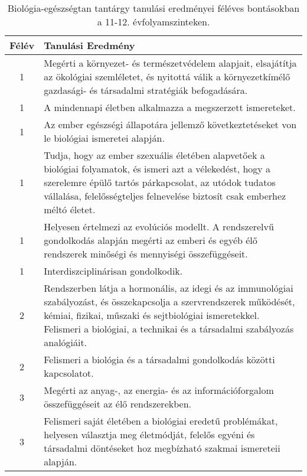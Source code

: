        
           \begin{longtable}{c | p{} }
            \caption[Biológia-egészségtan 11-12.]{Biológia-egészségtan tantárgy tanulási eredményei féléves bontásokban a 11-12. évfolyamszinteken. }  \\

            \textbf{Félév} & \textbf{Tanulási Eredmény} \\
            \hline
            \endhead
                                
                                          1 &  Megérti a környezet- és természetvédelem alapjait, elsajátítja az ökológiai szemléletet, és nyitottá válik a környezetkímélő gazdasági- és társadalmi stratégiák befogadására. \\ \hline
                                          1 &  A mindennapi életben alkalmazza a megszerzett ismereteket. \\ \hline
                                          1 &  Az ember egészségi állapotára jellemző következtetéseket von le biológiai ismeretei alapján. \\ \hline
                                          1 &  Tudja, hogy az ember szexuális életében alapvetőek a biológiai folyamatok, és ismeri azt a vélekedést, hogy a szerelemre épülő tartós párkapcsolat, az utódok tudatos vállalása, felelősségteljes felnevelése biztosít csak emberhez méltó életet. \\ \hline
                                          1 &  Helyesen értelmezi az evolúciós modellt. A rendszerelvű gondolkodás alapján megérti az emberi és egyéb élő rendszerek minőségi és mennyiségi összefüggéseit. \\ \hline
                                          1 &  Interdiszciplinárisan gondolkodik. \\ \hline
                                      
                                
                                          2 &  Rendszerben látja a hormonális, az idegi és az immunológiai szabályozást, és összekapcsolja a szervrendszerek működését, kémiai, fizikai, műszaki és sejtbiológiai ismeretekkel. Felismeri a biológiai, a technikai és a társadalmi szabályozás analógiáit. \\ \hline
                                          2 &  Felismeri a biológia és a társadalmi gondolkodás közötti kapcsolatot. \\ \hline
                                      
                                
                                          3 &  Megérti az anyag-, az energia- és az információforgalom összefüggéseit az élő rendszerekben. \\ \hline
                                          3 &  Felismeri saját életében a biológiai eredetű problémákat, helyesen választja meg életmódját, felelős egyéni és társadalmi döntéseket hoz megbízható szakmai ismereteii alapján. \\ \hline
                                      

\end{longtable}
